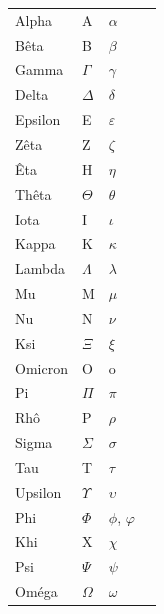 \documentclass[11pt,a4paper]{book}
\theoremstyle{definition}
\theoremstyle{plain}
\begin{document}
\begin{center}

\def\arraystretch{1.2}
\setlength\tabcolsep{20pt}
\begin{tabular}{llll}
Alpha		& A 			& $\alpha$\\
Bêta			& B 			& $\beta$\\
Gamma		& $\Gamma$ 	& $\gamma$\\
Delta		& $\Delta$ 	& $\delta$\\
Epsilon		& E 			& $\varepsilon$\\
Zêta			& Z 			& $\zeta$\\
Êta			& H 			& $\eta$\\
Thêta		& $\Theta$ 	& $\theta$\\
Iota			& I 			& $\iota$\\
Kappa		& K 			& $\kappa$\\
Lambda		& $\Lambda$ 	& $\lambda$\\
Mu			& M 			& $\mu$\\
Nu			& N 			& $\nu$\\
Ksi			& $\Xi$ 		& $\xi$\\
Omicron		& O 			& o\\
Pi			& $\Pi$ 		& $\pi$\\
Rhô			& P 			& $\rho$\\
Sigma		& $\Sigma$ 	& $\sigma$\\
Tau			& T 			& $\tau$\\
Upsilon		& $\Upsilon$& $\upsilon$\\
Phi			& $\Phi$ 	& $\phi$, $\varphi$\\
Khi			& X 			& $\chi$\\
Psi			& $\Psi$ 	& $\psi$ \\
Oméga		& $\Omega$ 	& $\omega$\\
\end{tabular}
\end{center}













\printindex
\end{document}
